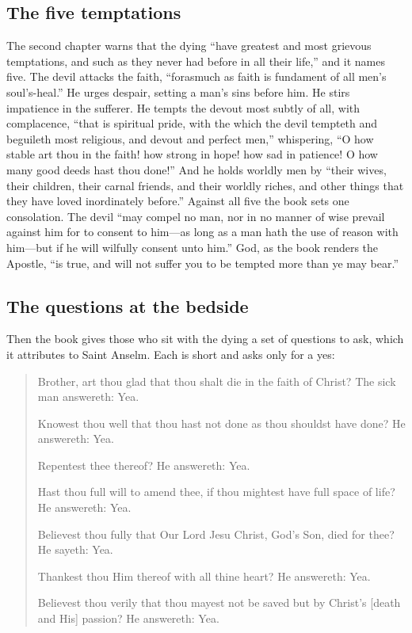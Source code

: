 \subsection{The five temptations}

The second chapter warns that the dying ``have greatest and most grievous temptations, and such as they never had before in all their life,'' and it names five. The devil attacks the faith, ``forasmuch as faith is fundament of all men's soul's-heal.'' He urges despair, setting a man's sins before him. He stirs impatience in the sufferer. He tempts the devout most subtly of all, with complacence, ``that is spiritual pride, with the which the devil tempteth and beguileth most religious, and devout and perfect men,'' whispering, ``O how stable art thou in the faith! how strong in hope! how sad in patience! O how many good deeds hast thou done!'' And he holds worldly men by ``their wives, their children, their carnal friends, and their worldly riches, and other things that they have loved inordinately before.'' Against all five the book sets one consolation. The devil ``may compel no man, nor in no manner of wise prevail against him for to consent to him---as long as a man hath the use of reason with him---but if he will wilfully consent unto him.'' God, as the book renders the Apostle, ``is true, and will not suffer you to be tempted more than ye may bear.''

\subsection{The questions at the bedside}

Then the book gives those who sit with the dying a set of questions to ask, which it attributes to Saint Anselm. Each is short and asks only for a yes:

\begin{quote}
Brother, art thou glad that thou shalt die in the faith of Christ? The sick man answereth: Yea.

Knowest thou well that thou hast not done as thou shouldst have done? He answereth: Yea.

Repentest thee thereof? He answereth: Yea.

Hast thou full will to amend thee, if thou mightest have full space of life? He answereth: Yea.

Believest thou fully that Our Lord Jesu Christ, God's Son, died for thee? He sayeth: Yea.

Thankest thou Him thereof with all thine heart? He answereth: Yea.

Believest thou verily that thou mayest not be saved but by Christ's [death and His] passion? He answereth: Yea.
\end{quote}

